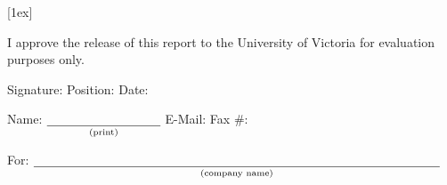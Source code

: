 {\begin{fminipage}{\textwidth}[1ex]
{				\medbreak

				I approve the release of this report to the University of
			  Victoria for evaluation purposes only.
		  }

			\bigbreak

			Signature: {\underline{\hspace{3.2cm}} \hspace{0.5ex}}
			Position: {\underline{\hspace{3cm}} \hspace{0.5ex}}
			Date: {\underline{\hspace{1.6cm}}}

			\bigbreak

			Name: $\underset{\text{(print)}}{\underline{\hspace{3.2cm}}}$
			\hspace{0.5ex}
			E-Mail: {\underline{\hspace{3cm}} \hspace{0.5ex}}
			Fax \#: {\underline{\hspace{2.1cm}}}

			\medbreak

			For: $\underset{\text{(company
			name)}}{\underline{\hspace{11.45cm}}}$

		\end{fminipage}}
\makeatother
